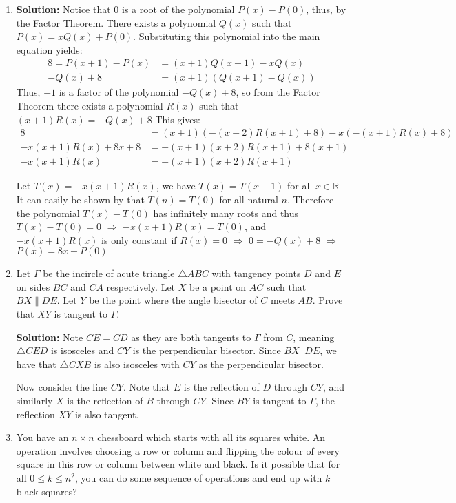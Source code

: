 \documentclass{article}
\begin{document}
\begin{enumerate}[itemsep=24pt]
\item
\textbf{Solution:} Notice that 0 is a root of the polynomial $P(x) - P(0)$, thus, by the Factor Theorem. There exists a polynomial $Q(x)$ such that $P(x) = xQ(x) + P(0)$. Substituting this polynomial into the main equation yields:
\begin{align*}
    8 = P(x+1) - P(x) & = (x+1)Q(x + 1) - xQ(x)\\
            -Q(x) + 8 & = (x+1)(Q(x+1) - Q(x))
\end{align*}
Thus, $-1$ is a factor of the polynomial $-Q(x) + 8$, so from the Factor Theorem there exists a polynomial $R(x)$ such that $(x+1)R(x) = - Q(x) + 8$ This gives:
\begin{align*}
    8 & = (x+1)(-(x+2)R(x+1) + 8) - x(-(x+1)R(x) + 8) \\
    -x(x+1)R(x) + 8x + 8 & = -(x+1)(x+2)R(x+1) + 8(x+1) \\
    -x(x+1)R(x) & = -(x+1)(x+2)R(x+1)
\end{align*}

Let $T(x) = -x(x+1)R(x)$, we have $T(x) = T(x+1)$ for all $x \in \mathbb{R}$ It can easily be shown by that $T(n) = T(0)$ for all natural $n$. Therefore the polynomial $T(x) - T(0)$ has infinitely many roots and thus $T(x) - T(0) = 0$ $\Rightarrow$ $-x(x+1)R(x) = T(0)$, and $-x(x+1)R(x)$ is only constant if $R(x) = 0$ $\Rightarrow$ $0 = -Q(x) + 8$ $\Rightarrow$ $P(x) = 8x + P(0)$

\item %
Let $\Gamma$ be the incircle of acute triangle $\triangle ABC$ with tangency points $D$ and $E$ on sides $BC$ and $CA$ respectively.
Let $X$ be a point on $AC$ such that $BX \parallel DE$.
Let $Y$ be the point where the angle bisector of $C$ meets $AB$.
Prove that $XY$ is tangent to $\Gamma$.

\textbf{Solution:}
Note $CE = CD$ as they are both tangents to $\Gamma$ from $C$, meaning $\triangle CED$ is isosceles and $CY$ is the perpendicular bisector. Since $BX\mathop{||}DE$, we have that $\triangle CXB$ is also isosceles with $CY$ as the perpendicular bisector.

Now consider the line $CY$. Note that $E$ is the reflection of $D$ through $CY$, and similarly $X$ is the reflection of $B$ through $CY$. Since $BY$ is tangent to $\Gamma$, the reflection $XY$ is also tangent.


\item %
You have an $n \times n$ chessboard which starts with all its squares white.
An operation involves choosing a row or column and flipping the colour of every square in this row or column between white and black.
Is it possible that for all $0 \leq k \leq n^2$, you can do some sequence of operations and end up with $k$ black squares?


\end{enumerate}
\end{document}
